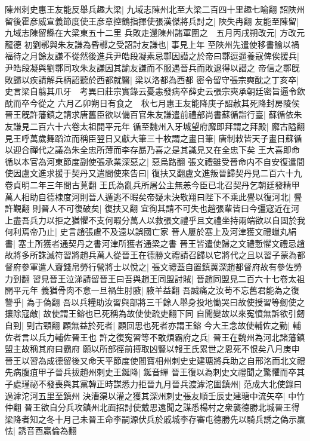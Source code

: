 陳州刺史惠王友能反舉兵趣大梁|{
	九域志陳州北至大梁二百四十里趣七喻翻}
詔陜州留後霍彦威宣義節度使王彦章控鶴指揮使張漢傑將兵討之|{
	陜失冉翻}
友能至陳留|{
	九域志陳留縣在大梁東五十二里}
兵敗走還陳州諸軍圍之　五月丙戌朔改元|{
	方改元龍德}
初劉鄩與朱友謙為昏鄩之受詔討友謙也|{
	事見上年}
至陜州先遣使移書諭以禍福待之月餘友謙不從然後進兵尹皓段凝素忌鄩因譛之於帝曰鄩逗遛養寇俾俟援兵|{
	尹皓段凝與劉鄩同攻朱友謙因其諭友謙而不服遇晉兵而敗退得以譛之}
帝信之鄩旣敗歸以疾請解兵柄詔聽於西都就醫|{
	梁以洛都為西都}
密令留守張宗奭酖之丁亥卒|{
	史言梁自翦其爪牙　考異曰莊宗實錄云憂恚發病卒薛史云張宗奭承朝廷密旨逼令飲酖而卒今從之}
六月乙卯朔日有食之　秋七月惠王友能降庚子詔赦其死降封房陵侯　晉王旣許藩鎮之請求唐舊臣欲以備百官朱友謙遣前禮部尚書蘇循詣行臺|{
	蘇循依朱友謙見二百六十六卷太祖開平元年}
循至魏州入牙城望府廨即拜謂之拜殿|{
	廨古隘翻}
見王呼萬歲舞蹈泣而稱臣翌日又獻大筆三十枚謂之畫日筆|{
	唐制敕皆天子畫日蘇循以迎合禪代之議為朱全忠所薄而李存勗乃喜之是其識見又在全忠下矣}
王大喜即命循以本官為河東節度副使張承業深惡之|{
	惡烏路翻}
張文禮雖受晉命内不自安復遣間使因盧文進求援于契丹又遣間使來告曰|{
	復扶又翻盧文進叛晉歸契丹見二百六十九卷貞明二年三年間古莧翻}
王氏為亂兵所屠公主無恙今臣已北召契丹乞朝廷發精甲萬人相助自德棣度河則晉人遁逃不暇矣帝疑未決敬翔曰陛下不乘此舋以復河北|{
	舋許覲翻}
則晉人不可復破矣|{
	復扶又翻}
宜徇其請不可失也趙張輩皆曰今彊寇近在河上盡吾兵力以拒之猶懼不支何暇分萬人以救張文禮乎且文禮坐持兩端欲以自固於我何利焉帝乃止|{
	史言趙張慮不及遠以誤國亡家}
晉人屢於塞上及河津獲文禮蠟丸絹書|{
	塞土所獲者通契丹之書河津所獲者通梁之書}
晉王皆遣使歸之文禮慙懼文禮忌趙故將多所誅滅符習將趙兵萬人從晉王在德勝文禮請召歸以它將代之且以習子蒙為都督府參軍遣人齎錢帛勞行營將士以悅之|{
	張文禮蓋自置鎮冀深趙都督府故有參佐勞力到翻}
習見晉王泣涕請留晉王曰吾與趙王同盟討賊|{
	晉趙同盟見二百六十七卷太祖開平元年}
義猶骨肉不意一旦禍生肘腋|{
	腋羊益翻}
吾誠痛之汝苟不忘舊君能為之復讐乎|{
	為于偽翻}
吾以兵糧助汝習與部將三千餘人舉身投地慟哭曰故使授習等劒使之攘除寇敵|{
	故使謂王鎔也已死稱為故使使疏吏翻下同}
自聞變故以來寃憤無訴欲引劒自剄|{
	剄古頸翻}
顧無益於死者|{
	顧回思也死者亦謂王鎔}
今大王念故使輔佐之勤|{
	輔佐者言以兵力輔佐晉王也}
許之復寃習等不敢煩霸府之兵|{
	晉王在魏州為河北諸藩鎮盟主故稱其府曰霸府}
願以所部徑前搏取凶豎以報王氏累世之恩死不恨矣八月庚申晉王以習為成德留後又命天平節度使閻寶相州刺史史建瑭將兵助之自邢洺而北文禮先病腹疽甲子晉兵拔趙州刺史王鋋降|{
	鋋音蟬}
晉王復以為刺史文禮聞之驚懼而卒其子處瑾祕不發喪與其黨韓正時謀悉力拒晉九月晉兵渡滹沱圍鎮州|{
	范成大北使錄曰過滹沱河五里至鎮州}
決漕渠以灌之獲其深州刺史張友順壬辰史建瑭中流矢卒|{
	中竹仲翻}
晉王欲自分兵攻鎮州北面招討使戴思遠聞之謀悉楊村之衆襲德勝北城晉王得梁降者知之冬十月己未晉王命李嗣源伏兵於戚城李存審屯德勝先以騎兵誘之偽示羸怯|{
	誘音酉羸倫為翻}
